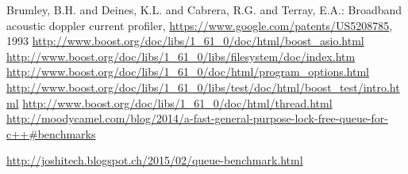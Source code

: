 \begin{thebibliography}{99}

  Brumley, B.H. and Deines, K.L. and Cabrera, R.G. and Terray, E.A.: Broadband acoustic doppler current profiler,  \url{https://www.google.com/patents/US5208785}, 1993
 \url{http://www.boost.org/doc/libs/1\_61\_0/doc/html/boost\_asio.html}
 \url{http://www.boost.org/doc/libs/1\_61\_0/libs/filesystem/doc/index.htm}
 \url{http://www.boost.org/doc/libs/1\_61\_0/doc/html/program\_options.html}
 \url{http://www.boost.org/doc/libs/1\_61\_0/libs/test/doc/html/boost\_test/intro.html}
 \url{http://www.boost.org/doc/libs/1\_61\_0/doc/html/thread.html}
 \url{http://moodycamel.com/blog/2014/a-fast-general-purpose-lock-free-queue-for-c++#benchmarks}

 \url{http://joshitech.blogspot.ch/2015/02/queue-benchmark.html}

\bibitem{}
\bibitem{}
\bibitem{}

\end{thebibliography}


